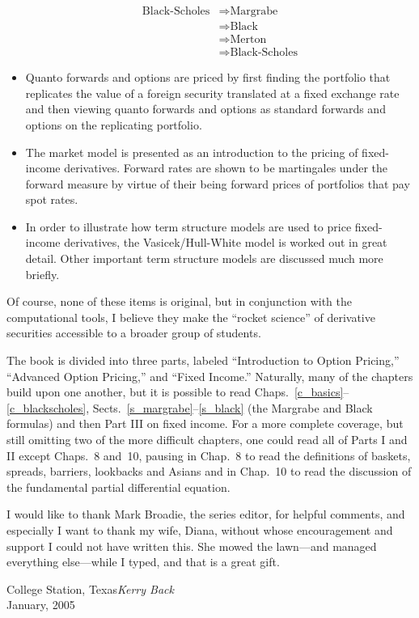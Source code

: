 \begin{itemize}
\begin{align*}
\text{Black-Scholes} &\Longrightarrow \text{Margrabe}\\
& \Longrightarrow \text{Black}\\
& \Longrightarrow \text{Merton}\\
& \Longrightarrow \text{Black-Scholes}
\end{align*}
\item Quanto forwards and options are priced by first finding the portfolio that replicates the value of a foreign security translated at a fixed exchange rate and then viewing quanto forwards and options as standard forwards and options on the replicating portfolio.
\item The market model is presented as an introduction to the pricing of fixed-income derivatives.  Forward rates are shown to be martingales under the forward measure by virtue of their being forward prices of portfolios that pay spot rates.
\item In order to illustrate how term structure models are used to price fixed-income derivatives, the Vasicek/Hull-White model is worked out in great detail.  Other important term structure models are discussed much more briefly.
\end{itemize}
Of course, none of these items is original, but in conjunction with the computational tools, I believe they make the ``rocket science'' of derivative securities accessible to a broader group of students.

The book is divided into three parts, labeled ``Introduction to Option Pricing,'' ``Advanced Option Pricing,'' and ``Fixed Income.''  Naturally, many of the chapters build upon one another, but it is possible to read Chaps.~\ref{c_basics}--\ref{c_blackscholes}, Sects.~\ref{s_margrabe}--\ref{s_black}  (the Margrabe and Black formulas) and then  Part III on fixed income.  For a more complete coverage, but still omitting two of the more difficult chapters, one could read all of Parts I and II except Chaps.~8 and~10, pausing in  Chap.~8 to read the definitions of baskets, spreads, barriers, lookbacks and Asians  and in Chap.~10 to read the discussion of the fundamental partial differential equation.

I would like to thank Mark Broadie, the series editor, for helpful comments, and especially I want to thank my wife, Diana, without whose encouragement and support I could not have written this.  She mowed the lawn---and managed everything else---while I typed, and that is a great gift.
\vspace{1cm}
\begin{flushright}\noindent
College Station, Texas\hfill {\it Kerry Back}\\
January, 2005 \hfill \\
\end{flushright}
